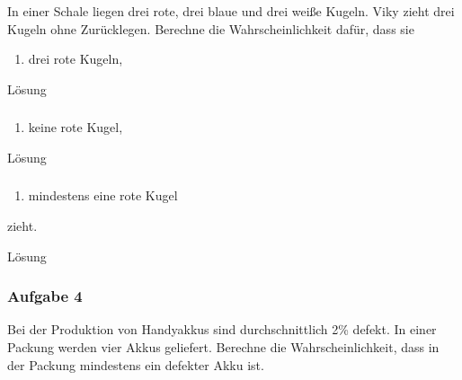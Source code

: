 \documentclass[
  ngerman,
]{book}
\providecommand{\tightlist}{%
  \setlength{\itemsep}{0pt}\setlength{\parskip}{0pt}}
\begin{document}
In einer Schale liegen drei rote, drei blaue und drei weiße Kugeln. Viky zieht drei Kugeln ohne Zurücklegen. Berechne die Wahrscheinlichkeit dafür, dass sie

\begin{enumerate}
\def\labelenumi{\alph{enumi})}
\tightlist
\item
  drei rote Kugeln,
\end{enumerate}

Lösung

\hypertarget{section-172}{%
\subsubsection*{}\label{section-172}}

\begin{enumerate}
\def\labelenumi{\alph{enumi})}
\setcounter{enumi}{1}
\tightlist
\item
  keine rote Kugel,
\end{enumerate}

Lösung

\hypertarget{section-173}{%
\subsubsection*{}\label{section-173}}

\begin{enumerate}
\def\labelenumi{\alph{enumi})}
\setcounter{enumi}{2}
\tightlist
\item
  mindestens eine rote Kugel
\end{enumerate}

zieht.

Lösung

\hypertarget{section-174}{%
\subsubsection*{}\label{section-174}}

\hypertarget{aufgabe-4-5}{%
\subsubsection*{Aufgabe 4}\label{aufgabe-4-5}}

Bei der Produktion von Handyakkus sind durchschnittlich 2\% defekt. In einer Packung werden vier Akkus geliefert. Berechne die Wahrscheinlichkeit, dass in der Packung mindestens ein defekter Akku ist.
\end{document}

